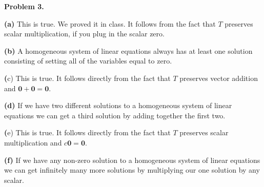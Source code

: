 \documentclass[oneside,12pt]{amsart}
\begin{document}
\textbf{Problem 3.}

\textbf{(a)} This is true. We proved it in class. It follows from the fact
that $T$ preserves scalar multiplication, if you plug in the scalar zero.

\smallskip

\textbf{(b)} A homogeneous system of linear equations always has at least
one solution consisting of setting all of the variables equal to zero.

\smallskip

\textbf(c) This is true. It follows directly from the fact that $T$ preserves
vector addition and $\mathbf{0} + \mathbf{0} = \mathbf{0}$.

\smallskip

\textbf{(d)} If we have two different solutions to a homogeneous system of
linear equations we can get a third solution by adding together the first two.

\smallskip

\textbf(e) This is true. It follows directly from the fact that $T$ preserves
scalar multiplication and $c \mathbf{0} = \mathbf{0}$.

\smallskip

\textbf{(f)} If we have any non-zero solution to a homogeneous system of linear
equations we can get infinitely many more solutions by multiplying our
one solution by any scalar.
\end{document}
